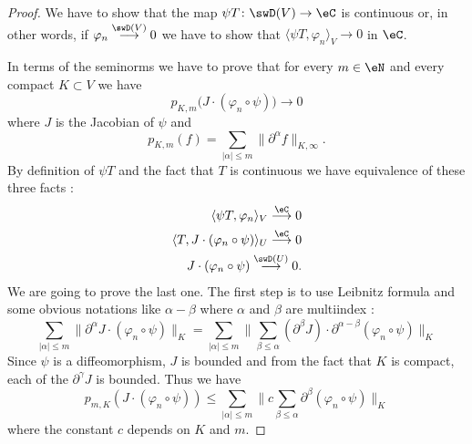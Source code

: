 \begin{proof}
    We have to show that the map \( \psi T\colon \swD(V)\to \eC\) is continuous or, in other words, if \( \varphi_n\stackrel{\swD(V)}{\longrightarrow}0\) we have to show that \( \langle \psi T, \varphi_n\rangle_V\to 0\) in \( \eC\).

    In terms of the seminorms we have to prove that for every \( m\in \eN\) and every compact \( K\subset V\) we have
    \begin{equation}
        p_{K,m}\big( J\cdot(\varphi_n\circ \psi) \big)\to 0
    \end{equation}
    where \( J\) is the Jacobian of \( \psi\) and 
    \begin{equation}
        p_{K,m}(f)=\sum_{| \alpha |\leq m}\| \partial^{\alpha}f \|_{K,\infty}.
    \end{equation}
    By definition of \( \psi T\) and the fact that \( T\) is continuous we have equivalence of these three facts :
    \begin{subequations}
        \begin{align}
            \langle \psi T, \varphi_n\rangle_V\stackrel{\eC}{\longrightarrow}0\\
            \langle  T, J\cdot (\varphi_n\circ \psi)  \rangle_U\stackrel{\eC}{\longrightarrow}0\\
            J\cdot(\varphi_n\circ\psi)\stackrel{\swD(U)}{\longrightarrow}0.
        \end{align}
    \end{subequations}
    We are going to prove the last one. The first step is to use Leibnitz formula and some obvious notations like \( \alpha-\beta\) where \( \alpha\) and \( \beta\) are multiindex :
    \begin{equation}
        \sum_{| \alpha |\leq m}\| \partial^{\alpha}J\cdot(\varphi_n\circ\psi) \|_{K}=\sum_{| \alpha |\leq m}\| \sum_{\beta\leq \alpha}(\partial^{\beta}J)\cdot \partial^{\alpha-\beta}(\varphi_n\circ\psi) \|_K
    \end{equation}
    Since \( \psi\) is a diffeomorphism, \( J\) is bounded and from the fact that \( K\) is compact, each of the \( \partial^{\gamma}J\) is bounded. Thus we have
    \begin{equation}
        p_{m,K}(J\cdot (\varphi_n\circ \psi))\leq \sum_{| \alpha |\leq m}\|c \sum_{\beta\leq \alpha} \partial^{\beta}(\varphi_n\circ\psi) \|_{K}
    \end{equation}
    where the constant \( c\) depends on \( K\) and \( m\).


\end{proof}
